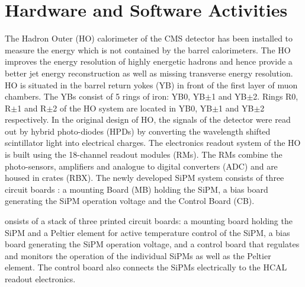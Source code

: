 \chapter{Hardware and Software Activities}
\label{chap:Hardware}

The Hadron Outer (HO) calorimeter of the CMS detector has been installed to measure the energy which is not contained by the barrel calorimeters. The HO improves the energy resolution of highly energetic hadrons and hence provide a better jet energy reconstruction as well as missing transverse energy resolution. HO is situated in the barrel return yokes (YB) in front of the first layer of muon chambers. The YBs consist of 5 rings of iron: YB0, YB$\pm$1 and YB$\pm$2. Rings R0, R$\pm$1 and R$\pm$2 of the HO system are located in YB0, YB$\pm$1 and YB$\pm$2 respectively. In the original design of HO, the signals of the detector were read out by hybrid photo-diodes (HPDs) by converting the wavelength shifted scintillator light into electrical charges. The electronics readout system of the HO is built using the 18-channel readout modules (RMs). The RMs combine the photo-sensors, amplifiers and analogue to digital converters (ADC) and are housed in crates (RBX). The newly developed SiPM system consists of three circuit boards : a mounting Board (MB) holding the SiPM, a bias
board generating the SiPM operation voltage and the Control Board (CB). 


onsists of a stack of three printed circuit boards: a mounting board
holding the SiPM and a Peltier element for active temperature control of the SiPM, a bias
board generating the SiPM operation voltage, and a control board that regulates and monitors
the operation of the individual SiPMs as well as the Peltier element. The control board also
connects the SiPMs electrically to the HCAL readout electronics. 


